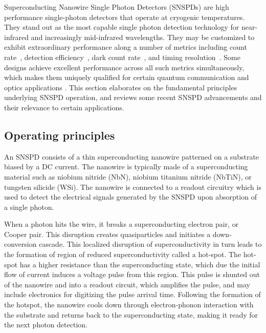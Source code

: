 \documentclass[11pt]{caltech_thesis} %
\begin{document}
Superconducting Nanowire Single Photon Detectors (SNSPDs) are high performance single-photon detectors that operate at cryogenic temperatures. They stand out as the most capable single photon detection technology for near-infrared and increasingly mid-infrared wavelengths. They may be customized to exhibit extraordinary performance along a number of metrics including count rate~\autocite{Craiciu23}, detection efficiency~\autocite{marsili2013detecting,reddy2020superconducting}, dark count rate~\autocite{Shibata2015,Mueller:21}, and timing resolution~\autocite{Korzh2020}. Some designs achieve excellent performance across all such metrics simultaneously, which makes them uniquely qualified for certain quantum communication and optics applications \autocite{Colangelo2023}. This section elaborates on the fundamental principles underlying SNSPD operation, and reviews some recent SNSPD advancements and their relevance to certain applications.

\hypertarget{operating-principles}{%
\subsection{Operating principles}\label{operating-principles}}

An SNSPD consists of a thin superconducting nanowire patterned on a substrate biased by a DC current. The nanowire is typically made of a superconducting material such as niobium nitride (NbN), niobium titanium nitride (NbTiN), or tungsten silicide (WSi). The nanowire is connected to a readout circuitry which is used to detect the electrical signals generated by the SNSPD upon absorption of a single photon.

When a photon hits the wire, it breaks a superconducting electron pair, or Cooper pair. This disruption creates quasiparticles and initiates a down-conversion cascade. This localized disruption of superconductivity in turn leads to the formation of region of reduced superconductivity called a hot-spot. The hot-spot has a higher resistance than the superconducting state, which due the initial flow of current induces a voltage pulse from this region. This pulse is shunted out of the nanowire and into a readout circuit, which amplifies the pulse, and may include electronics for digitizing the pulse arrival time. Following the formation of the hotspot, the nanowire cools down through electron-phonon interaction with the substrate and returns back to the superconducting state, making it ready for the next photon detection.
\end{document}
